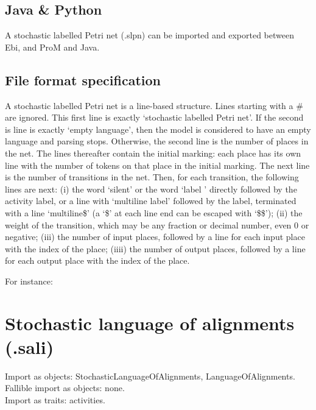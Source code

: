 {\subsection*{Java \& Python}
A stochastic labelled Petri net (.slpn) can be imported and exported between Ebi, and ProM and Java.
\subsection*{File format specification}A stochastic labelled Petri net is a line-based structure. Lines starting with a \# are ignored.
    This first line is exactly `stochastic labelled Petri net'.
    If the second is line is exactly `empty language', then the model is considered to have an empty language and parsing stops.
    Otherwise, the second line is the number of places in the net.
    The lines thereafter contain the initial marking: each place has its own line with the number of tokens on that place in the initial marking.
    The next line is the number of transitions in the net.
    Then, for each transition, the following lines are next: 
    (i) the word `silent' or the word `label ' directly followed by the activity label, or a line with `multiline label' followed by the label, terminated with a line `multiline\$' (a `\$' at each line end can be escaped with `\$\$');
    (ii) the weight of the transition, which may be any fraction or decimal number, even 0 or negative;
    (iii) the number of input places, followed by a line for each input place with the index of the place;
    (iiii) the number of output places, followed by a line for each output place with the index of the place.
    
    For instance:
    
\clearpage
\section{Stochastic language of alignments (.sali)}
\label{filehandler:stochastic language of alignments}
Import as objects: StochasticLanguageOfAlignments, LanguageOfAlignments.
\\Fallible import as objects: none.
\\Import as traits: activities.
}
